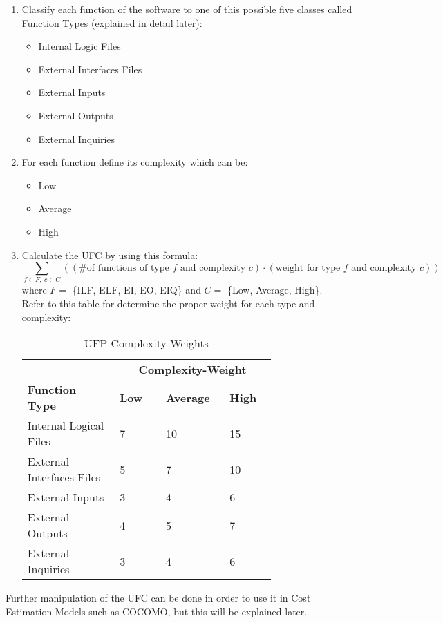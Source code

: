 \begin{enumerate}
	\item Classify each function of the software to one of this possible five classes called Function Types (explained in detail later):
	\begin{itemize}
		\item Internal Logic Files
		\item External Interfaces Files
		\item External Inputs
		\item External Outputs
		\item External Inquiries
	\end{itemize}
	\item For each function define its complexity which can be:
	\begin{itemize}
		\item Low
		\item Average
		\item High
	\end{itemize}
	\item Calculate the UFC by using this formula:
	$$ \sum_{f \in F,\ c \in C} \left((\textrm{\# of functions of type } f \textrm{ and complexity } c) \cdot (\textrm{weight for type } f \textrm{ and complexity } c ) \right) $$
	where $F = $ \{ILF, ELF, EI, EO, EIQ\} and $C = $ \{Low, Average, High\}. \\
	Refer to this table for determine the proper weight for each type and complexity:
	\begin{table}[H]
	\centering
	\begin{tabular}{x{0.3\linewidth}x{0.15\linewidth}x{0.15\linewidth}x{0.15\linewidth}}
		\hline 
		&  \\
		\textbf{Function Type} & \textbf{Low} &\textbf{Average} & \textbf{High} \\
		\hline
		Internal Logical Files & 7 & 10 & 15 \\
		External Interfaces Files & 5 & 7 & 10 \\
		External Inputs & 3 & 4 & 6 \\
		External Outputs & 4 & 5 & 7 \\
		External Inquiries & 3 & 4 & 6 \\
		\hline
	\end{tabular}
	\caption{UFP Complexity Weights}
\end{table}
\end{enumerate}
Further manipulation of the UFC can be done in order to use it in Cost Estimation Models such as COCOMO, but this will be explained later.
